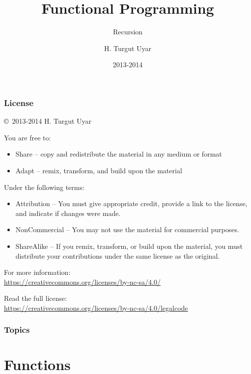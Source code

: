 \documentclass[dvipsnames]{beamer}
\title{Functional Programming}
\subtitle{Recursion}
\author{H. Turgut Uyar}
\date{2013-2014}
\theoremstyle{plain}
\begin{document}
\begin{frame}
  \titlepage
\end{frame}

\begin{frame}
  \frametitle{License}

  \hfill
  \copyright~2013-2014 H. Turgut Uyar

  \vfill
  \begin{footnotesize}
    You are free to:
    \begin{itemize}
      \itemsep0em
      \item Share -- copy and redistribute the material in any medium or format
      \item Adapt -- remix, transform, and build upon the material
    \end{itemize}

    Under the following terms:
    \begin{itemize}
      \itemsep0em
      \item Attribution -- You must give appropriate credit, provide a link to
        the license, and indicate if changes were made.

      \item NonCommercial -- You may not use the material for commercial
        purposes.

      \item ShareAlike -- If you remix, transform, or build upon the material,
        you must distribute your contributions under the same license as the
        original.
    \end{itemize}
  \end{footnotesize}

  \begin{small}
    For more information:\\
    \url{https://creativecommons.org/licenses/by-nc-sa/4.0/}

    \smallskip
    Read the full license:\\
    \url{https://creativecommons.org/licenses/by-nc-sa/4.0/legalcode}
  \end{small}
\end{frame}

\begin{frame}
  \frametitle{Topics}
  \tableofcontents
\end{frame}

\section{Functions}
\end{document}
